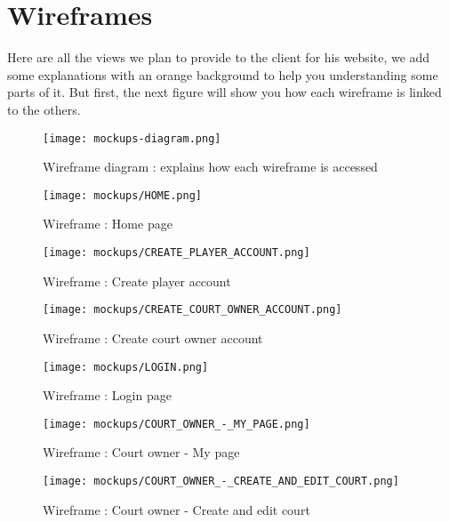 \section{Wireframes}

Here are all the views we plan to provide to the client for his website, we
add some explanations with an orange background to help you understanding
some parts of it. But first, the next figure will show you how each wireframe is
linked to the others.

\begin{figure}[!ht]
    \centering
    \texttt{[image: mockups-diagram.png]}
    \caption{Wireframe diagram : explains how each wireframe is accessed}
\end{figure}
\FloatBarrier

\begin{figure}[!ht]
    \centering
    \texttt{[image: mockups/HOME.png]}
    \caption{Wireframe : Home page}
\end{figure}
\FloatBarrier

\begin{figure}[!ht]
    \centering
    \texttt{[image: mockups/CREATE\_PLAYER\_ACCOUNT.png]}
    \caption{Wireframe : Create player account}
\end{figure}
\FloatBarrier

\begin{figure}[!ht]
    \centering
    \texttt{[image: mockups/CREATE\_COURT\_OWNER\_ACCOUNT.png]}
    \caption{Wireframe : Create court owner account}
\end{figure}
\FloatBarrier

\begin{figure}[!ht]
    \centering
    \texttt{[image: mockups/LOGIN.png]}
    \caption{Wireframe : Login page}
\end{figure}
\FloatBarrier

\begin{figure}[!ht]
    \centering
    \texttt{[image: mockups/COURT\_OWNER\_-\_MY\_PAGE.png]}
    \caption{Wireframe : Court owner - My page}
\end{figure}
\FloatBarrier

\begin{figure}[!ht]
    \centering
    \texttt{[image: mockups/COURT\_OWNER\_-\_CREATE\_AND\_EDIT\_COURT.png]}
    \caption{Wireframe : Court owner - Create and edit court}
\end{figure}
\FloatBarrier

